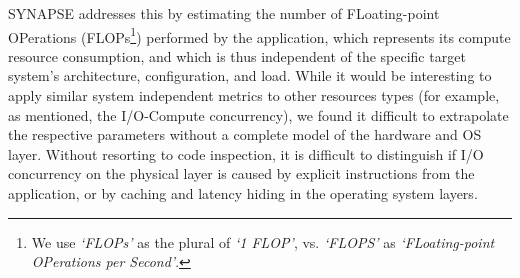 \documentclass[preprint,12pt]{elsarticle}
\newcommand{\amnote}[1]{{\textcolor{magenta}    { ***Andre: #1 }}}
\newcommand{\amnote}[1]{}
\newcommand{\I}[1]{\textit{#1}\xspace}
\begin{document}
SYNAPSE addresses this by estimating the number of FLoating-point OPerations
(FLOPs\footnote{We use \I{`FLOPs'} as the plural of \I{`1 FLOP'},
  vs. \I{`FLOPS'} as \I{`FLoating-point OPerations per Second'}.}) performed by
the application, which represents its compute resource consumption, and which is
thus independent of the specific target system's architecture, configuration,
and load.  While it would be interesting to apply similar system independent
metrics to other resources types (for example, as mentioned, the I/O-Compute
concurrency), we found it difficult to extrapolate the respective parameters
without a complete model of the hardware and OS layer. Without resorting to code
inspection, it is difficult to distinguish if I/O concurrency on the physical
layer is caused by explicit instructions from the application, or by caching and
latency hiding in the operating system layers.

\end{document}
